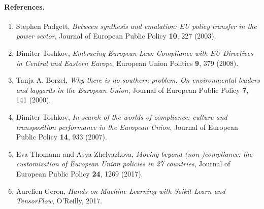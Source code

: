 \documentclass[%
oneside,                 %
final,                   %
10pt]{article}
\begin{document}
\paragraph{References.}
\begin{enumerate}
\item Stephen   Padgett, \emph{Between synthesis and emulation: EU policy transfer in the power sector}, Journal of European Public Policy \textbf{10}, 227 (2003).

\item Dimiter Toshkov, \emph{Embracing European Law: Compliance with EU Directives in Central and Eastern Europe}, European Union Politics \textbf{9}, 379 (2008).

\item Tanja A. Borzel, \emph{Why there is no southern problem. On environmental leaders and laggards in the European Union}, Journal of European Public Policy \textbf{7}, 141 (2000).

\item Dimiter Toshkov, \emph{In search of the worlds of compliance: culture and transposition performance in the European Union}, Journal of European Public Policy \textbf{14}, 933 (2007).

\item Eva Thomann and Asya Zhelyazkova, \emph{Moving beyond (non-)compliance: the customization of European Union policies in 27 countries}, Journal of European Public Policy \textbf{24}, 1269 (2017). 

\item Aurelien Geron, \emph{Hands-on Machine Learning with Scikit-Learn and TensorFlow}, O'Reilly, 2017.
\end{enumerate}

\noindent

\end{document}
